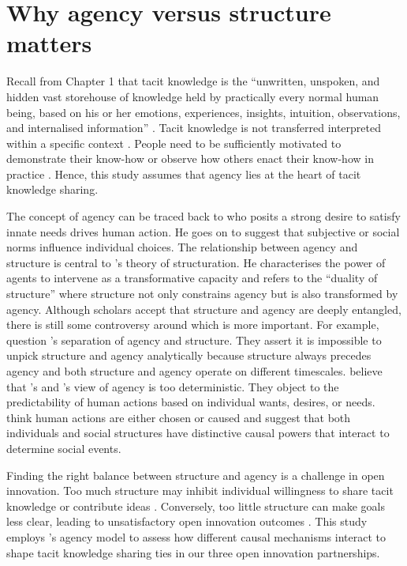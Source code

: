 \section{Why agency versus structure matters}

Recall from Chapter 1 that tacit knowledge is the \enquote{unwritten, unspoken, and hidden vast storehouse of knowledge held by practically every normal human being, based on his or her emotions, experiences, insights, intuition, observations, and internalised information} \citep{kreutz2014catalyzing}. Tacit knowledge is not transferred interpreted within a specific context \citep{nonaka1994dynamic,duguid2005art,marabelli2014knowing,zhang2020extended}. People need to be sufficiently motivated to demonstrate their know-how or observe how others enact their know-how in practice \citep{gagne2009model}. Hence, this study assumes that agency lies at the heart of tacit knowledge sharing. \medskip

The concept of agency can be traced back to \citet{parsons1937structure} who posits a strong desire to satisfy innate needs drives human action. He goes on to suggest that subjective or social norms influence individual choices. The relationship between agency and structure is central to \citet{giddens1984constitution}'s theory of structuration. He characterises the power of agents to intervene as a transformative capacity and refers to the \enquote{duality of structure} where structure not only constrains agency but is also transformed by agency. Although scholars accept that structure and agency are deeply entangled, there is still some controversy around which is more important. For example, \citet{archer1998critical} question \citeauthor{giddens1984constitution}'s \citeyearpar{giddens1984constitution} separation of agency and structure. They assert it is impossible to unpick structure and agency analytically because structure always precedes agency and both structure and agency operate on different timescales. \citet{loyal2001agency} believe that \citeauthor{parsons1937structure}'s \citeyearpar{parsons1937structure} and \citeauthor{giddens1984constitution}'s \citeyearpar{giddens1984constitution} view of agency is too deterministic. They object to the predictability of human actions based on individual wants, desires, or needs. \citet{loyal2001agency} think human actions are either chosen or caused and suggest that both individuals and social structures have distinctive causal powers that interact to determine social events. \medskip 

Finding the right balance between structure and agency is a challenge in open innovation. Too much structure may inhibit individual willingness to share tacit knowledge or contribute ideas \citep{davis2010agency}. Conversely, too little structure can make goals less clear, leading to unsatisfactory open innovation outcomes \citep{lam2000tacit}. This study employs \citeauthor{loyal2001agency}'s \citeyearpar{loyal2001agency} agency model to assess how different causal mechanisms interact to shape tacit knowledge sharing ties in our three open innovation partnerships.

